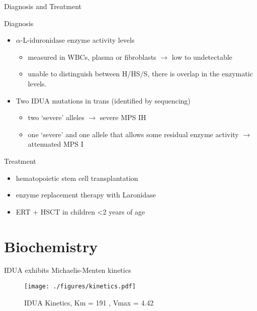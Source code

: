 \documentclass[presentation, smaller]{beamer}
\begin{document}
\begin{frame}[label={sec:orgheadline3}]{Diagnosis and Treatment}
\begin{block}{Diagnosis}
\begin{itemize}
\item \(\alpha\)-L-iduronidase enzyme activity levels
\begin{itemize}
\item measured in WBCs, plasma or fibroblasts \(\to\) low to undetectable
\item unable to distinguish between H/HS/S, there is overlap in the enzymatic levels.
\end{itemize}
\item Two ​IDUA mutations in trans (identified by sequencing)
\begin{itemize}
\item two ‘severe’ alleles \(\to\) severe MPS IH
\item one ‘severe’ and one allele that allows some residual enzyme
activity \(\to\) attenuated MPS I
\end{itemize}
\end{itemize}
\end{block}

\begin{block}{Treatment}
\begin{itemize}
\item hematopoietic stem cell transplantation
\item enzyme replacement therapy with Laronidase
\item ERT + HSCT in children <2 years of age
\end{itemize}
\end{block}
\end{frame}


\section{Biochemistry}
\label{sec:orgheadline8}
\begin{frame}[label={sec:orgheadline5}]{IDUA exhibits Michaelis-Menten kinetics}
\begin{figure}[htb]
\centering
\texttt{[image: ./figures/kinetics.pdf]}
\caption{\label{fig:mm}
IDUA Kinetics, Km = 191 , Vmax = 4.42}
\end{figure}
\end{frame}
\end{document}
